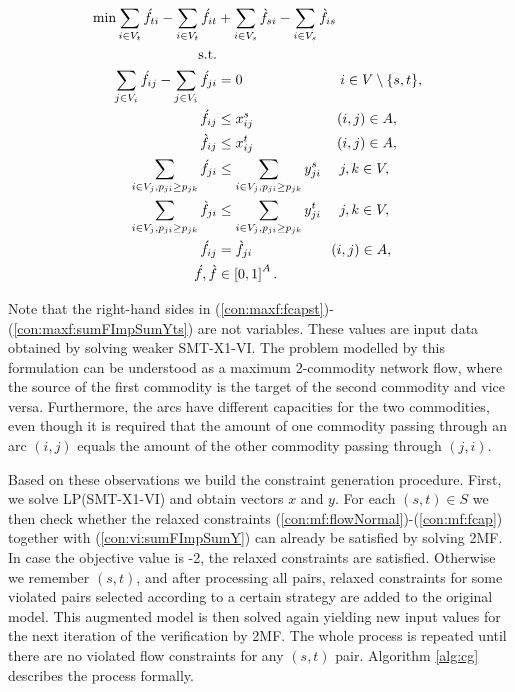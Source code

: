 \begin{subequations}\label{eq:mf}
\begin{flalign}
\label{objective:maxf} \min \sum\limits_{i \in V_t} \acute{f}_{ti} - \sum\limits_{i \in V_t} \acute{f}_{it} &+ \sum\limits_{i \in V_s} \grave{f}_{si} - \sum\limits_{i \in V_s} \grave{f}_{is}  \\ 
\text{s.t.}    \notag   \\	
 \label{con:maxf:flowNormal}  \sum\limits_{\substack{ j\in V_i}}\acute{f}_{ij}-\sum\limits_{\substack{j\in V_i }}\acute{f}_{ji}    & = 0   \quad \quad\quad \quad\quad \quad\quad 			   i\in V\setminus\{s,t\},\\	
 \label{con:maxf:fcapst}   \acute{f}_{ij} &\leq  x^{s}_{ij}\quad\quad\quad\quad    \quad\quad  (i,j)\in A,  \\ 	 
  \label{con:maxf:fcapts}   \grave{f}_{ij} &\leq  x^{t}_{ij}\quad\quad\quad\quad\quad\quad      (i,j)\in A,  \\ 	
  \label{con:maxf:sumFImpSumYst} \sum\limits_{i\in V_j, p_{ji}\geq p_{jk}}\acute{f}_{ji} & \leq \sum\limits_{i\in V_j, p_{ji}\geq p_{jk}}  y^{s}_{ji} ~~~~  j,k\in V,\\
  \label{con:maxf:sumFImpSumYts} \sum\limits_{i\in V_j, p_{ji}\geq p_{jk}}\grave{f}_{ji} & \leq \sum\limits_{i\in V_j, p_{ji}\geq p_{jk}}  y^{t}_{ji} ~~~~  j,k\in V,\\
    \label{con:maxf:fsym}   \acute{f}_{ij} &=  \grave{f}_{ji}  \quad\quad \quad\quad   \quad~~(i,j)\in A, \\ 
\label{con:maxf:fdim}	\acute{f}, \grave{f}&\in\left[0,1\right]^{A}. 
\end{flalign}~
\end{subequations}  
  
Note that the right-hand sides in (\ref{con:maxf:fcapst})-(\ref{con:maxf:sumFImpSumYts}) are not variables. These values are input data obtained by solving weaker SMT-X1-VI. The problem modelled by this formulation can be understood as a maximum 2-commodity network flow, where the source of the first commodity is the target of the second commodity and vice versa. Furthermore, the arcs have different capacities for the two commodities, even though it is required that the amount of one commodity passing through an arc $(i,j)$ equals the amount of the other commodity passing through $(j,i)$.
 
Based on these observations we build the constraint generation procedure. First, we solve LP(SMT-X1-VI) and obtain vectors $x$ and $y$. For each $(s,t)\in S$ we then check whether the relaxed constraints (\ref{con:mf:flowNormal})-(\ref{con:mf:fcap}) together with (\ref{con:vi:sumFImpSumY}) can already be satisfied by solving 2MF. In case the objective value is -2, the relaxed constraints are satisfied. Otherwise  we remember $(s,t)$, and after processing all pairs, relaxed constraints for some violated pairs selected according to a certain strategy are added to the original model. This augmented model is then solved again yielding new input values for the next iteration of the verification by 2MF.  The whole process is repeated until there are no violated flow constraints for any $(s,t)$ pair. Algorithm \ref{alg:cg} describes the process formally.

